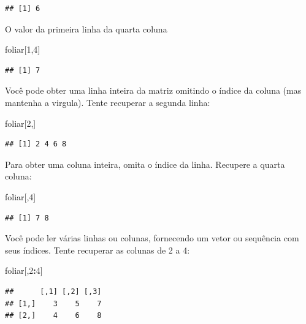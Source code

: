 \documentclass[]{book}
\newenvironment{Shaded}{\begin{snugshade}}{\end{snugshade}}
\newcommand{\DecValTok}[1]{\textcolor[rgb]{0.00,0.00,0.81}{#1}}
\newcommand{\NormalTok}[1]{#1}
\newcommand{\OperatorTok}[1]{\textcolor[rgb]{0.81,0.36,0.00}{\textbf{#1}}}
\begin{document}
\begin{verbatim}
## [1] 6
\end{verbatim}

O valor da primeira linha da quarta coluna

\begin{Shaded}
\begin{Highlighting}[]
\NormalTok{foliar[}\DecValTok{1}\NormalTok{,}\DecValTok{4}\NormalTok{]}
\end{Highlighting}
\end{Shaded}

\begin{verbatim}
## [1] 7
\end{verbatim}

Você pode obter uma linha inteira da matriz omitindo o índice da coluna (mas mantenha a virgula). Tente recuperar a segunda linha:

\begin{Shaded}
\begin{Highlighting}[]
\NormalTok{foliar[}\DecValTok{2}\NormalTok{,]}
\end{Highlighting}
\end{Shaded}

\begin{verbatim}
## [1] 2 4 6 8
\end{verbatim}

Para obter uma coluna inteira, omita o índice da linha. Recupere a quarta coluna:

\begin{Shaded}
\begin{Highlighting}[]
\NormalTok{foliar[,}\DecValTok{4}\NormalTok{]}
\end{Highlighting}
\end{Shaded}

\begin{verbatim}
## [1] 7 8
\end{verbatim}

Você pode ler várias linhas ou colunas, fornecendo um vetor ou sequência com seus índices. Tente recuperar as colunas de 2 a 4:

\begin{Shaded}
\begin{Highlighting}[]
\NormalTok{foliar[,}\DecValTok{2}\OperatorTok{:}\DecValTok{4}\NormalTok{]}
\end{Highlighting}
\end{Shaded}

\begin{verbatim}
##      [,1] [,2] [,3]
## [1,]    3    5    7
## [2,]    4    6    8
\end{verbatim}
\end{document}
